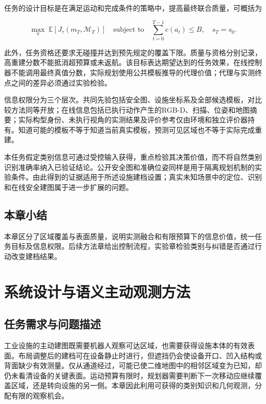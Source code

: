 \documentclass[11pt,a4paper]{article}
\numberwithin{equation}{section}
\begin{document}
任务的设计目标是在满足运动和完成条件的策略中，提高最终联合质量，可概括为

\begin{equation}
\max_\pi\;\mathbb E[J_\tau(m_T,\mathcal M_T)]
\quad\text{subject to}\quad
\sum_{t=0}^{T-1}c(a_t)\le B,\quad s_T=s_0.
\end{equation}

此外，任务资格还要求无碰撞并达到预先规定的覆盖下限。质量与资格分别记录，高重建分数不能抵消超预算或未返航。该目标表达期望达到的任务效果，在线控制器不能调用最终真值分数，实际规划使用公共模板推导的代理价值；代理与实测终点之间的差异必须通过实验检验。

信息权限分为三个层次。共同先验包括安全图、设施坐标系及全部候选模板，对比较方法同等开放；在线信息包括已执行动作产生的RGB-D、扫描、位姿和地图摘要；实际构型身份、未执行视角的实测结果及评价参考仅由环境和独立评价器持有。知道可能的模板不等于知道当前真实模板，预测可见区域也不等于实际完成重建。

本任务假定类别信息可通过受控输入获得，重点检验其决策价值，而不将自然类别识别准确率纳入已验证结论。公开安全图和准确位姿同样是用于隔离规划机制的实验条件。由此得到的证据适用于所述设施建档设置；真实未知场景中的定位、识别和在线安全建图属于进一步扩展的问题。

\hypertarget{ux672cux7ae0ux5c0fux7ed3}{%
\subsection{本章小结}\label{ux672cux7ae0ux5c0fux7ed3}}

本章区分了区域覆盖与表面质量，说明实测融合和有限预算下的信息价值，统一任务目标及信息权限。后续方法章给出控制流程，实验章检验类别与纠错是否通过行动改变建档结果。

\hypertarget{ux7cfbux7edfux8bbeux8ba1ux4e0eux8bedux4e49ux4e3bux52a8ux89c2ux6d4bux65b9ux6cd5}{%
\clearpage
\section{系统设计与语义主动观测方法}\label{ux7cfbux7edfux8bbeux8ba1ux4e0eux8bedux4e49ux4e3bux52a8ux89c2ux6d4bux65b9ux6cd5}}

\hypertarget{ux4efbux52a1ux9700ux6c42ux4e0eux95eeux9898ux63cfux8ff0}{%
\subsection{任务需求与问题描述}\label{ux4efbux52a1ux9700ux6c42ux4e0eux95eeux9898ux63cfux8ff0}}

工业设施的主动建图既需要机器人观察可达区域，也需要获得设施本体的有效表面。布局调整后的建档可在设备静止时进行，但遮挡仍会使设备开口、凹入结构或背面缺少有效测量。仅从通道经过，可能已使二维地图中的相邻区域变为已知，却仍未看清设备的关键表面。运动预算有限时，规划器需要判断下一次移动应继续覆盖区域，还是转向设施的另一侧。本章因此利用可获得的类别知识和几何观测，分配有限的观察机会。
\end{document}
